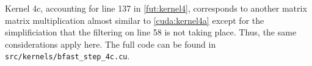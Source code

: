 Kernel 4c, accounting for line 137 in \autoref{fut:kernel4}, corresponds to
another matrix matrix multiplication almost similar to \autoref{cuda:kernel4a}
except for the simplificiation that the filtering on line 58 is not taking
place. Thus, the same considerations apply here. The full code can be found in
\texttt{src/kernels/bfast\_step\_4c.cu}.





